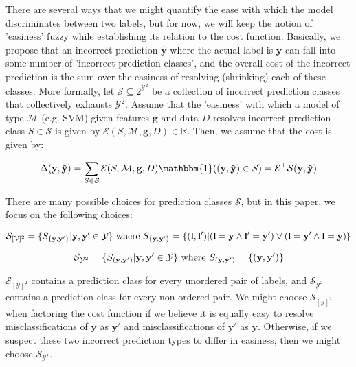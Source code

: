 \documentclass{article} %
\begin{document}
There are several ways that we might quantify 
the ease with which the model discriminates between two labels,
but for now, we will keep the notion of 'easiness' fuzzy while
establishing its relation to the cost function.
Basically, we propose that an incorrect prediction 
$\mathbf{\hat{y}}$ where the actual label is $\mathbf{y}$ can 
fall into some number of 'incorrect prediction classes', and
the overall cost of the incorrect prediction is the sum over the
easiness of resolving (shrinking) each of these classes.  More
formally, let $\mathcal{S}\subseteq 2^{\mathcal{Y}^2}$ be a 
collection of incorrect prediction classes that collectively 
exhausts $\mathcal{Y}^2$.  Assume that the 'easiness' with 
which a model of type $\mathcal{M}$ (e.g. SVM) given features 
$\mathbf{g}$ and data $D$ resolves incorrect prediction 
class $S\in\mathcal{S}$ is given by 
$\mathcal{E}(S,\mathcal{M},\mathbf{g},D)\in\mathbb{R}$.
Then, we assume that the cost is given by:

\begin{equation}
\Delta(\mathbf{y},\mathbf{\hat{y}})=\sum_{S\in\mathcal{S}}\mathcal{E}(S,\mathcal{M},\mathbf{g}, D)\mathbbm{1}((\mathbf{y},\mathbf{\hat{y}})\in S)=
\mathbf{\mathcal{E}}^\top \mathbf{\mathcal{S}}(\mathbf{y},\mathbf{\hat{y}})
\end{equation}

There are many possible choices for prediction classes $\mathcal{S}$, but
in this paper, we focus on the following choices:

\begin{equation}
\mathcal{S}_{[\mathcal{Y}]^2} = \{ S_{\{\mathbf{y},\mathbf{y}'\}} | \mathbf{y},\mathbf{y}'\in\mathcal{Y}\}\text{ where }S_{\{\mathbf{y},\mathbf{y}'\}}=\{ (\mathbf{l}, \mathbf{l}') | (\mathbf{l}=\mathbf{y}\wedge \mathbf{l}'=\mathbf{y}')\vee(\mathbf{l}=\mathbf{y}'\wedge \mathbf{l}=\mathbf{y}) \} \\
\end{equation}

\begin{equation}
\mathcal{S}_{\mathcal{Y}^2} = \{ S_{(\mathbf{y},\mathbf{y}')} | \mathbf{y},\mathbf{y}'\in\mathcal{Y}\}\text{ where }S_{(\mathbf{y},\mathbf{y}')}=\{ (\mathbf{y},\mathbf{y}') \} \\
\end{equation}

$\mathcal{S}_{[\mathcal{Y}]^2}$ contains a prediction class for every
unordered pair of labels, and $\mathcal{S}_{\mathcal{Y}^2}$ contains
a prediction class for every non-ordered pair.  We might choose 
$\mathcal{S}_{[\mathcal{Y}]^2}$ when factoring the cost function if
we believe it is equally easy to resolve misclassifications of 
$\mathbf{y}$ as $\mathbf{y}'$ and misclassifications of $\mathbf{y}'$
as $\mathbf{y}$.  Otherwise, if we suspect these two incorrect 
prediction types to differ in easiness, then we might choose 
$\mathcal{S}_{\mathcal{Y}^2}$.
\end{document}
